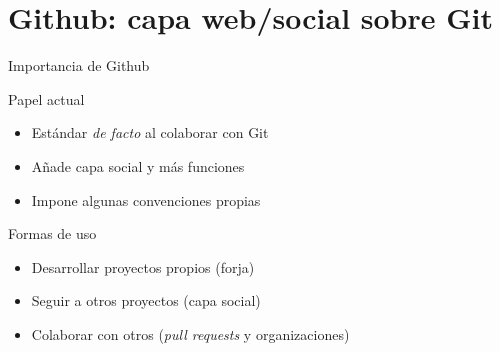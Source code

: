 \documentclass[xcolor=svgnames]{beamer}
\newcommand*{\tipo}[1]{\textit{#1}}
\newcommand*{\inlinecmd}[1]{{\small\ttfamily\nohyphens{#1}}}
\begin{document}

\section[Github]{Github: capa web/social sobre Git}

\begin{frame}{Importancia de Github}
  \begin{block}{Papel actual}
    \begin{itemize}
    \item Estándar \emph{de facto} al colaborar con Git
    \item Añade capa social y más funciones
    \item Impone algunas convenciones propias
    \end{itemize}
  \end{block}

  \begin{block}{Formas de uso}
    \begin{itemize}
    \item Desarrollar proyectos propios (forja)
    \item Seguir a otros proyectos (capa social)
    \item Colaborar con otros (\emph{pull requests} y organizaciones)
    \end{itemize}
  \end{block}
\end{frame}
\end{document}
